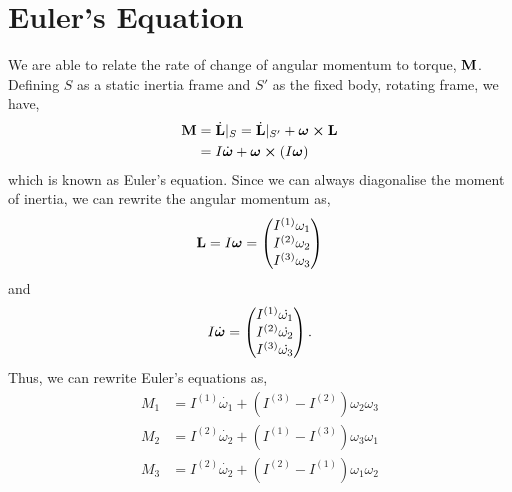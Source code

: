\documentclass{book}
\begin{document}
\section{Euler's Equation}
We are able to relate the rate of change of angular momentum to torque, $\vb{M}$. Defining $S$ as a static inertia frame and $S'$ as the fixed body, rotating frame, we have,
\begin{equation}
\begin{split}
    \vb{M}& = \Dot{\vb{L}}|_S = \Dot{\vb{L}}|_{S'} + \vb*{\omega}\cross\vb{L}
    \\ & = I\Dot{\vb*{\omega}} + \vb*{\omega}\cross\left(I\vb*{\omega}\right)
\end{split}
\end{equation}
which is known as Euler's equation. Since we can always diagonalise the moment of inertia, we can rewrite the angular momentum as,
\begin{equation}
    \vb{L} = I \vb*{\omega} = \begin{pmatrix}
        I^{(1)}\omega_1 \\ I^{(2)}\omega_2\\ I^{(3)}\omega_3
    \end{pmatrix}
\end{equation}
and 
\begin{equation}
    I\Dot{\vb*{\omega}} = \begin{pmatrix}
        I^{(1)}\Dot{\omega_1} \\ I^{(2)}\Dot{\omega_2} \\ I^{(3)}\Dot{\omega_3}
    \end{pmatrix}.
\end{equation}
Thus, we can rewrite Euler's equations as,
\begin{equation}
    \begin{split}
        M_1 & = I^{(1)}\Dot{\omega_1} + (I^{(3)} - I^{(2)})\omega_2\omega_3  \\
        M_2 & = I^{(2)}\Dot{\omega_2} + (I^{(1)} - I^{(3)})\omega_3\omega_1 \\
        M_3& = I^{(2)}\Dot{\omega_2} + (I^{(2)} - I^{(1)})\omega_1\omega_2
    \end{split}
\end{equation}
\newpage
\end{document}
